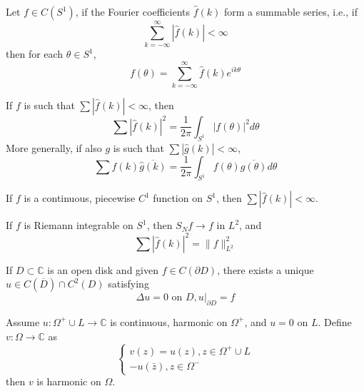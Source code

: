 \documentclass[openany]{book}
\newcommand{\C}{\mathbb{C}}
\begin{document}
\begin{prop}
    Let $f\in C(S^1)$, if the Fourier coefficients $\hat{f}(k)$ form a summable series, i.e., if 
    \begin{equation*}
        \sum_{k=-\infty}^\infty|\hat{f}(k)|<\infty
    \end{equation*}
    then for each $\theta\in S^1$, 
    \begin{equation*}
        f(\theta)=\sum_{k=-\infty}^\infty\hat{f}(k)e^{ik\theta}
    \end{equation*}
\end{prop}



\begin{prop}
    If $f$ is such that $\sum|\hat{f}(k)|<\infty$, then 
    \begin{equation*}
        \sum|\hat{f}(k)|^2=\frac{1}{2\pi}\int_{S^1}|f(\theta)|^2d\theta
    \end{equation*}
    More generally, if also $g$ is such that $\sum|\hat{g}(k)|<\infty$, 
    \begin{equation*}
        \sum\hat{f}(k)\overline{\hat{g}(k)}=\frac{1}{2\pi}\int_{S^1}f(\theta)\overline{g(\theta)}d\theta
    \end{equation*}
\end{prop}

\begin{prop}
    If $f$ is a continuous, piecewise $C^1$ function on $S^1$, then $\sum|\hat{f}(k)|<\infty$.
\end{prop}

\begin{prop}
    If $f$ is Riemann integrable on $S^1$, then $S_Nf\to f$ in $L^2$, and 
    \begin{equation*}
        \sum|\hat{f}(k)|^2=\|f\|_{L^2}^2
    \end{equation*}
\end{prop}

\begin{prop}
    If $D\subset\C$ is an open disk and given $f\in C(\partial D)$, there exists a unique $u\in C(\overline{D})\cap C^2(D)$ satisfying 
    \begin{equation*}
        \Delta u=0 \text{ on } D, u\vert_{\partial D}=f
    \end{equation*}
\end{prop}


\begin{prop}
    Assume $u:\Omega^+\cup L\to\C$ is continuous, harmonic on $\Omega^+$, and $u=0$ on $L$. Define $v:\Omega\to\C$ as 
    \begin{equation*}
        \begin{cases}
            v(z)=u(z), z\in \Omega^+\cup L\\
            -u(\bar{z}), z\in\Omega^-
        \end{cases}
    \end{equation*}
    then $v$ is harmonic on $\Omega$.
\end{prop}
\end{document}
